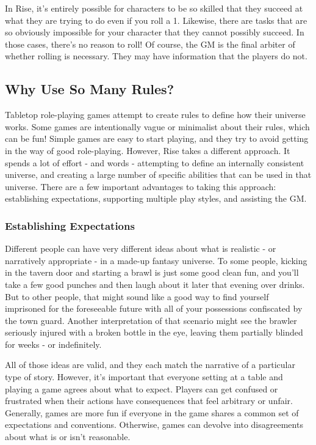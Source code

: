         In Rise, it's entirely possible for characters to be so skilled that they succeed at what they are trying to do even if you roll a 1.
        Likewise, there are tasks that are so obviously impossible for your character that they cannot possibly succeed.
        In those cases, there's no reason to roll!
        Of course, the GM is the final arbiter of whether rolling is necessary.
        They may have information that the players do not.

    \subsection{Why Use So Many Rules?}

        Tabletop role-playing games attempt to create rules to define how their universe works.
        Some games are intentionally vague or minimalist about their rules, which can be fun!
        Simple games are easy to start playing, and they try to avoid getting in the way of good role-playing.
        However, Rise takes a different approach.
        It spends a lot of effort - and words - attempting to define an internally consistent universe, and creating a large number of specific abilities that can be used in that universe.
        There are a few important advantages to taking this approach: establishing expectations, supporting multiple play styles, and assisting the GM.

        \subsubsection{Establishing Expectations}
            Different people can have very different ideas about what is realistic - or narratively appropriate - in a made-up fantasy universe.
            To some people, kicking in the tavern door and starting a brawl is just some good clean fun, and you'll take a few good punches and then laugh about it later that evening over drinks.
            But to other people, that might sound like a good way to find yourself imprisoned for the foreseeable future with all of your possessions confiscated by the town guard.
            Another interpretation of that scenario might see the brawler seriously injured with a broken bottle in the eye, leaving them partially blinded for weeks - or indefinitely.

            All of those ideas are valid, and they each match the narrative of a particular type of story.
            However, it's important that everyone setting at a table and playing a game agrees about what to expect.
            Players can get confused or frustrated when their actions have consequences that feel arbitrary or unfair.
            Generally, games are more fun if everyone in the game shares a common set of expectations and conventions.
            Otherwise, games can devolve into disagreements about what is or isn't reasonable.

